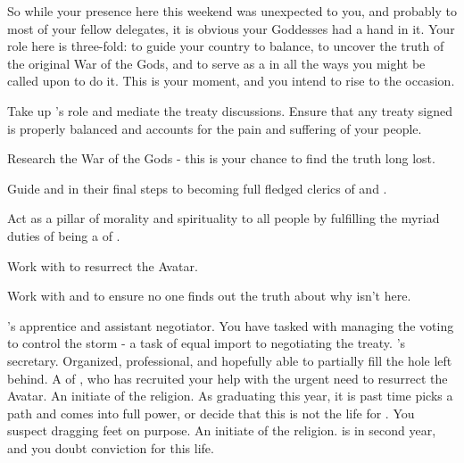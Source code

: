 \documentclass[char]{GL2020}
\begin{document}
So while your presence here this weekend was unexpected to you, and probably to most of your fellow delegates, it is obvious your Goddesses had a hand in it. Your role here is three-fold: to guide your country to balance, to uncover the truth of the original War of the Gods, and to serve as a \cEbbPriest{\cleric} in all the ways you might be called upon to do it. This is your moment, and you intend to rise to the occasion.

\begin{itemz}[Goals]
	\item Take up \cHeadDiplomat{}’s role and mediate the treaty discussions. Ensure that any treaty signed is properly balanced and accounts for the pain and suffering of your people.
	\item Research the War of the Gods - this is your chance to find the truth long lost.
	\item Guide \cInitiate{} and \cWarlordDaughter{} in their final steps to becoming full fledged clerics of \cEbb{} and \cFlow{}.
	\item Act as a pillar of morality and spirituality to all people by fulfilling the myriad duties of being a \cEbbPriest{\cleric} of \cEbb{\full}.
	\item Work with \cFlowPriest{} to resurrect the \cEbb{} Avatar.
	\item Work with \cJuniorStatesman{} and \cChupLeader{} to ensure no one finds out the truth about why \cHeadDiplomat{} isn’t here.
\end{itemz}

\begin{itemz}[Notes]
	\item 
\end{itemz}

\begin{contacts}
	\contact{\cJuniorStatesman{}} \cHeadDiplomat{}’s apprentice and assistant negotiator. You have tasked \cJuniorStatesman{} with managing the voting to control the storm - a task of equal import to negotiating the treaty.
	\contact{\cChupLeader{}} \cHeadDiplomat{}’s secretary. Organized, professional, and hopefully able to partially fill the hole \cHeadDiplomat{} left behind.
	\contact{\cFlowPriest{}} A \cFlowPriest{\cleric} of \cFlow{}, who has recruited your help with the urgent need to resurrect the \cEbb{} Avatar.
\contact{\cInitiate{}} An initiate of the \pShippies{} religion. As \cInitiate{\they} \cInitiate{\are} graduating this year, it is past time \cInitiate{} picks a path and comes into \cInitiate{\their} full power, or decide that this is not the life for \cInitiate{\them}. You suspect \cInitiate{\they} \cInitiate{\are} dragging \cInitiate{\their} feet on purpose.
\contact{\cWarlordDaughter{}} An initiate of the \pShippies{} religion. \cWarlordDaughter{} is in \cWarlordDaughter{\their} second year, and you doubt  conviction for this life.

\end{contacts}
\end{document}
